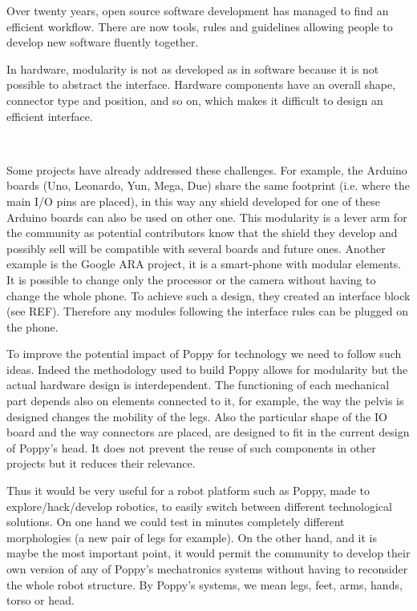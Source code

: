 Over twenty years, open source software development has managed to find an efficient workflow. There are now tools, rules and guidelines allowing people to develop new software fluently together.

In hardware, modularity is not as developed as in software because it is not possible to abstract the interface. Hardware components have an overall shape, connector type and position, and so on, which makes it difficult to design an efficient interface.

\begin{figure}[tb]
\centering
    \hfil
     \\
    \caption{}
    \label{fig:hardware-modularity}
\end{figure}

Some projects have already addressed these challenges. For example, the Arduino boards (Uno, Leonardo, Yun, Mega, Due) share the same footprint (i.e. where the main I/O pins are placed), in this way any shield developed for one of these Arduino boards can also be used on other one. This modularity is a lever arm for the community as potential contributors know that the shield they develop and possibly sell will be compatible with several boards and future ones.
Another example is the Google ARA project, it is a smart-phone with modular elements. It is possible to change only the processor or the camera without having to change the whole phone. To achieve such a design, they created an interface block (see REF). Therefore any modules following the interface rules can be plugged on the phone.


To improve the potential impact of Poppy for technology we need to follow such ideas. Indeed the methodology used to build Poppy allows for modularity but the actual hardware design is interdependent. The functioning of each mechanical part depends also on elements connected to it, for example, the way the pelvis is designed changes the mobility of the legs. Also the particular shape of the IO board and the way connectors are placed, are designed to fit in the current design of Poppy's head. It does not prevent the reuse of such components in other projects but it reduces their relevance.

Thus it would be very useful for a robot platform such as Poppy, made to explore/hack/develop robotics, to easily switch between different technological solutions. On one hand we could test in minutes completely different morphologies (a new pair of legs for example). On the other hand, and it is maybe the most important point, it would permit the community to develop their own version of any of Poppy's mechatronics systems without having to reconsider the whole robot structure. By Poppy's systems, we mean legs, feet, arms, hands, torso or head.


